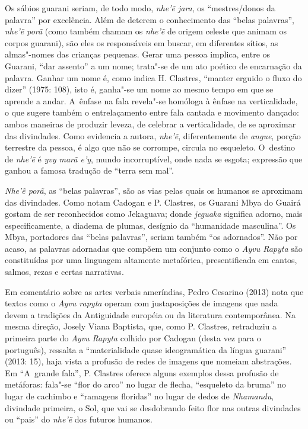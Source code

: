 Os sábios guarani seriam, de todo modo, \emph{nhe’ẽ jara}, os
``mestres/donos da palavra'' por excelência. Além de deterem o
conhecimento das ``belas palavras'', \emph{nhe’ẽ porã} (como também chamam
os \emph{nhe’ẽ} de origem celeste que animam os corpos guarani), são
eles os responsáveis em buscar, em diferentes sítios, as almas"-nomes
das crianças pequenas. Gerar uma pessoa implica, entre os Guarani, ``dar
assento'' a um nome; trata"-se de um ato poético de encarnação da
palavra. Ganhar um nome é, como indica H. Clastres, ``manter erguido o
fluxo do dizer'' (1975: 108), isto é, ganha"-se um nome ao mesmo tempo em
que se aprende a andar. A~ênfase na fala revela"-se homóloga à ênfase na
verticalidade, o que sugere também o entrelaçamento entre fala cantada
e movimento dançado: ambos maneiras de produzir leveza, de celebrar a
verticalidade, de se aproximar das divindades. Como evidencia a autora,
\emph{nhe’ẽ}, diferentemente de \emph{angue}, porção terrestre da pessoa, é
algo que não se corrompe, circula no esqueleto. O~destino de
\emph{nhe’ẽ} é \emph{yvy marã e’y}, mundo incorruptível, onde nada se esgota;
expressão que ganhou a famosa tradução de ``terra sem mal''.

\emph{Nhe’ẽ porã}, as ``belas palavras'', são as vias pelas quais os
humanos se aproximam das divindades. Como notam Cadogan e P. Clastres,
os Guarani Mbya do Guairá gostam de ser reconhecidos como Jekaguava;
donde \emph{jeguaka} significa adorno, mais especificamente, a diadema de
plumas, desígnio da ``humanidade masculina''. Os Mbya, portadores das
``belas palavras'', seriam também ``os adornados''. Não por acaso, as
palavras adornadas que compõem um conjunto como o \emph{Ayvu Rapyta} são
constituídas por uma linguagem altamente metafórica, presentificada em
cantos, salmos, rezas e certas narrativas.

Em comentário sobre as artes verbais ameríndias, Pedro Cesarino (2013)
nota que textos como o \emph{Ayvu rapyta} operam com justaposições de imagens
que nada devem a tradições da Antiguidade européia ou da literatura
contemporânea. Na mesma direção, Josely Viana Baptista, que, como P.
Clastres, retraduziu a primeira parte do \emph{Ayvu Rapyta} colhido por
Cadogan (desta vez para o português), ressalta a ``materialidade quase
ideogramática da língua guarani'' (2013: 15), haja vista a profusão de
redes de imagens que nomeiam abstrações. Em ``A~grande fala'', P. Clastres
oferece alguns exemplos dessa profusão de metáforas: fala"-se ``flor do
arco'' no lugar de flecha, ``esqueleto da bruma'' no lugar de cachimbo e
``ramagens floridas'' no lugar de dedos de \emph{Nhamandu}, divindade primeira,
o Sol, que vai se desdobrando feito flor nas outras divindades ou
``pais'' do \emph{nhe’ẽ} dos futuros humanos.

